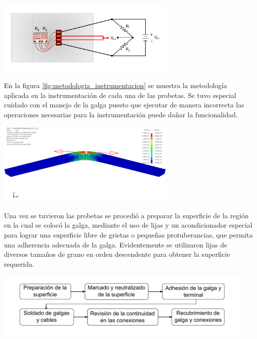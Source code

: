 \begin{center}
\includegraphics[width=0.65\textwidth]{src/ch3/diagrama_conexion.pdf}
\label{fig:diagrama_conexion}
\end{center}

En la figura \ref{fig:metodologia_instrumentacion} se muestra la metodología aplicada 
en la instrumentación de cada una de las probetas. Se tuvo especial cuidado con el 
manejo de la galga puesto que ejecutar de manera incorrecta las operaciones necesarias 
para la instrumentación puede dañar la funcionalidad. \\

\begin{center}
\includegraphics[width=0.65\textwidth]{src/ch3/dir_prin_strain.png}
\label{fig:dir_prin_strain}
\end{center}

Una vez se tuvieron las probetas se procedió a preparar la superficie de la región en 
la cual se colocó la galga, mediante el uso de lijas y un acondicionador especial 
para lograr una superficie libre de grietas o pequeñas protuberancias, que permita 
una adherencia adecuada de la galga. Evidentemente se utilizaron lijas de diversos 
tamaños de grano en orden descendente para obtener la superficie requerida.\\

\begin{center}
\includegraphics[width=0.95\textwidth]{src/ch3/metodologia_instrumentacion.pdf}
\label{fig:metodologia_instrumentacion}
\end{center}

